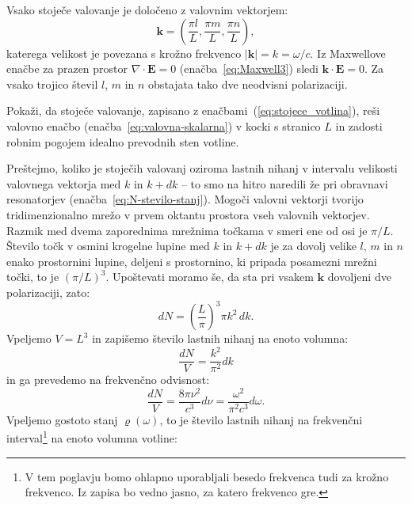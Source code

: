 Vsako stoječe valovanje je določeno z valovnim 
vektorjem:
\begin{equation}
\mathbf{k}=\left(\frac{\pi l}{L},\frac{\pi m}{L},\frac{\pi n}{L}\right)\!\!,
\end{equation} 
katerega velikost je povezana s krožno frekvenco $|\mathbf{k}|= k = \omega/c$.
Iz Maxwellove enačbe za prazen prostor $\nabla\cdot\mathbf{E}=0$ (enačba~\ref{eq:Maxwell3})
sledi $\mathbf{k}\cdot\mathbf{E}=0$. 
Za vsako trojico števil $l$, $m$ in $n$ obstajata tako dve
neodvisni polarizaciji.
\begin{naloga}
 Pokaži, da stoječe valovanje, zapisano z enačbami~(\ref{eq:stojece_votlina}), reši 
 valovno enačbo (enačba~\ref{eq:valovna-skalarna}) v 
 kocki s stranico $L$ in zadosti robnim pogojem idealno prevodnih sten votline.
\end{naloga}

Preštejmo, koliko je stoječih valovanj oziroma lastnih nihanj 
v intervalu velikosti valovnega
vektorja med $k$ in $k+dk$ -- to smo na hitro naredili že pri obravnavi
resonatorjev (enačba~\ref{eq:N-stevilo-stanj}). Mogoči valovni vektorji tvorijo tridimenzionalno
mrežo v prvem oktantu prostora vseh valovnih vektorjev. Razmik med
dvema zaporednima mrežnima točkama v smeri ene od osi je $\pi/L$.
Število točk v osmini krogelne lupine med $k$ in $k+dk$ je za dovolj
velike $l$, $m$ in $n$ enako prostornini lupine, deljeni
s prostornino, ki pripada posamezni mrežni točki, to je $(\pi/L)^{3}$.
Upoštevati moramo še, da sta pri vsakem $\mathbf{k}$ dovoljeni dve polarizaciji, zato:
\begin{equation}
dN=\left(\frac{L}{\pi}\right)^{3}\pi k^{2}\, dk.
\label{4.2}
\end{equation}
Vpeljemo $V = L^3$ in zapišemo število lastnih nihanj na enoto volumna:
\begin{equation}
\frac{dN}{V}=\frac{ k^{2}}{\pi^{2}} dk
\label{4.3}
\end{equation}
in ga prevedemo na frekvenčno odvisnost:
\begin{equation}
\frac{dN}{V}=\frac{8 \pi \nu^{2} }{c^{3}}d\nu = \frac{\omega^2}{\pi^2c^3}d\omega.
\end{equation}
Vpeljemo gostoto stanj  $\varrho (\omega)$, to je število lastnih nihanj na 
frekvenčni interval\footnote{V tem poglavju bomo ohlapno uporabljali besedo
frekvenca tudi za krožno frekvenco. Iz zapisa bo vedno jasno, za katero frekvenco gre.}
na enoto volumna votline:


